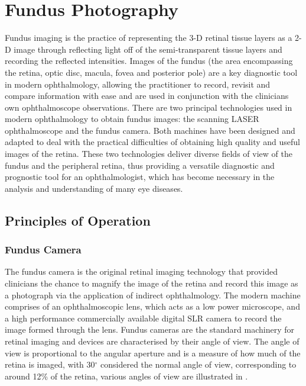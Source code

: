 
\chapter{Fundus Photography}
\label{fundus_photography}


Fundus imaging is the practice of representing the 3-D retinal
tissue layers as a 2-D image through reflecting light off of
the semi-transparent tissue layers and recording the reflected
intensities. Images of the fundus (the area encompassing the
retina, optic disc, macula, fovea and posterior pole) are a key
diagnostic tool in modern ophthalmology, allowing the practitioner
to record, revisit and compare information with ease and are used
in conjunction with the clinicians own ophthalmoscope observations.
There are two principal technologies used in modern ophthalmology
to obtain fundus images: the scanning LASER ophthalmoscope and the
fundus camera. Both machines have been designed and adapted to deal
with the practical difficulties of obtaining high quality and useful
images of the retina. These two technologies deliver diverse fields
of view of the fundus and the peripheral retina, thus providing a
versatile diagnostic and prognostic tool for an ophthalmologist,
which has become necessary in the analysis and understanding of
many eye diseases.\cite{spaide2005medical}


\section{Principles of Operation}

\subsection{Fundus Camera}

The fundus camera is the original retinal imaging technology that
provided clinicians the chance to magnify the image of the retina
and record this image as a photograph via the application of indirect
ophthalmology. The modern machine comprises of an ophthalmoscopic lens,
which acts as a low power microscope, and a high performance commercially
available digital SLR camera to record the image formed through the
lens.\cite{shibata2003fundus} Fundus cameras are the standard machinery
for retinal imaging and devices are characterised by their angle of
view. The angle of view is proportional to the angular aperture and is a
measure of how much of the retina is imaged, with 30$^\circ$ considered
the normal angle of view, corresponding to around 12\% of the retina,
various angles of view are illustrated in .

